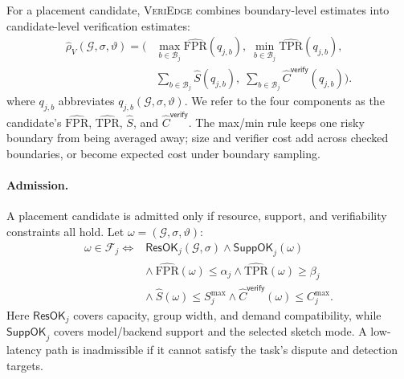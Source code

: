 \documentclass[sigplan,screen,review,anonymous]{acmart}
\newcommand{\system}{\textsc{VeriEdge}\xspace}
\begin{document}
For a placement candidate, \system combines boundary-level estimates into
candidate-level verification estimates:
\begin{equation}
\begin{aligned}
\widehat{\rho}_V(\mathcal{G},\sigma,\vartheta)
= \big(&\max_{b\in\mathcal{B}_j}
          \widehat{\mathrm{FPR}}(q_{j,b}),\;
       \min_{b\in\mathcal{B}_j}
          \widehat{\mathrm{TPR}}(q_{j,b}),\\
      &\sum_{b\in\mathcal{B}_j}\widehat{S}(q_{j,b}),\;
       \sum_{b\in\mathcal{B}_j}
          \widehat{C}^{\mathsf{verify}}(q_{j,b})\big).
\end{aligned}
\label{eq:profile-aggregation}
\end{equation}
where \(q_{j,b}\) abbreviates
\(q_{j,b}(\mathcal{G},\sigma,\vartheta)\). We refer to the four components as
the candidate's \(\widehat{\mathrm{FPR}}\), \(\widehat{\mathrm{TPR}}\),
\(\widehat{S}\), and \(\widehat{C}^{\mathsf{verify}}\). The max/min rule keeps
one risky boundary from being averaged away; size and verifier cost add across
checked boundaries, or become expected cost under boundary sampling.

\paragraph{Admission.}
A placement candidate is admitted only if resource, support, and
verifiability constraints all hold. Let
\(\omega=(\mathcal{G},\sigma,\vartheta)\):
\begin{equation}
\begin{aligned}
\omega\in\mathcal{F}_j \iff&
 \mathsf{ResOK}_j(\mathcal{G},\sigma)\land \mathsf{SuppOK}_j(\omega)\\
&\land\ \widehat{\mathrm{FPR}}(\omega)\le\alpha_j
 \land \widehat{\mathrm{TPR}}(\omega)\ge\beta_j\\
&\land\ \widehat{S}(\omega)\le S^{\max}_j
 \land \widehat{C}^{\mathsf{verify}}(\omega)\le C^{\max}_j .
\end{aligned}
\label{eq:placement-feasibility}
\end{equation}
Here \(\mathsf{ResOK}_j\) covers capacity, group width, and demand
compatibility, while \(\mathsf{SuppOK}_j\) covers model/backend support and the
selected sketch mode. A low-latency path is inadmissible if it cannot satisfy
the task's dispute and detection targets.
\end{document}
